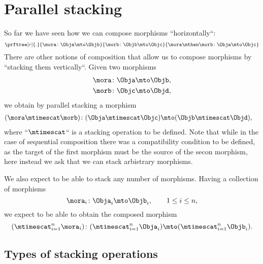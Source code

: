 \section{Parallel stacking}

So far we have seen how we can compose morphisms ``horizontally``:
%
\begin{equation}
    \prftree[r]{.
    }{
        \mora \colon \Obja \mto \Objb
    }{
        \morb\colon \Objb \mto \Objc
    }{
        \mora \mthen \morb \colon \Obja \mto \Objc
    }
\end{equation}
%
There are other notions of composition that allow us to compose morphisms by ``stacking them vertically``.
Given two morphisms
%
\begin{align}
    \mora & \colon \Obja \mto \Objb, \\
    \morb & \colon \Objc \mto \Objd,
\end{align}
%
we obtain by parallel stacking a morphism
%
\begin{align}
    (\mora\mtimescat \morb) & \colon (\Obja \mtimescat \Objc) \mto (\Objb \mtimescat \Objd),
\end{align}
%
where ``$\mtimescat$`` is a stacking operation to be defined.
Note that while in the case of sequential composition there was a compatibility condition to be defined, as the target of the first morphism must be the source of the secon morphism, here instead we ask that we can stack arbistrary morphisms.

We also expect to be able to stack any number of morphisms.
Having a collection of morphisms
%
\begin{equation}
    \mora_i \colon \Obja_i \mto \Objb_i, \qquad 1 \leq i \leq n,
\end{equation}
%
we expect to be able to obtain the composed morphism
%
\begin{equation}
    (\mtimescat_{i=1}^n  \mora_i )\colon( \mtimescat_{i=1}^n  \Obja_i )\mto (\mtimescat_{i=1}^n  \Objb_i).
\end{equation}

\subsection{Types of stacking operations}

